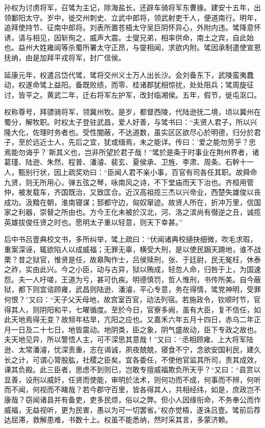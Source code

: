\documentclass[12pt,UTF8]{ctexbook}
\begin{document}
孙权为讨虏将军，召骘为主记，除海盐长，还辟车骑将军东曹掾。建安十五年，出领鄱阳太守。岁中，徙交州刺史、立武中郎将，领武射吏千人，便道南行。明年，追拜使持节、征南中郎将。刘表所置苍梧太守吴巨阴怀异心，外附内违。骘降意怀诱，请与相见，因斩徇之，威声大震。士燮兄弟，相率供命，南土之宾，自此始也。益州大姓雍闿等杀蜀所署太守正昂，与燮相闻，求欲内附。骘因承制遣使宣恩抚纳，由是加拜平戎将军，封广信侯。

延康元年，权遣吕岱代骘，骘将交州义士万人出长沙。会刘备东下，武陵蛮夷蠢动，权遂命骘上益阳。备既败绩，而零、桂诸郡犹相惊扰，处处阻兵；骘周旋征讨，皆平之。黄武二年，迁右将军左护军，改封临湘侯。五年，假节，徙屯沤口。

权称尊号，拜骠骑将军，领冀州牧。是岁，都督西陵，代陆逊抚二境，顷以冀州在蜀分，解牧职。时权太子登驻武昌，爱人好善，与骘书曰：“夫贤人君子，所以兴隆大化，佐理时务者也。受性闇蔽，不达道数，虽实区区欲尽心於明德，归分於君子，至於远近士人，先后之宜，犹或缅焉，未之能详。传曰：'爱之能勿劳乎？忠焉能勿诲乎？'斯其义也，岂非所望於君子哉！”骘於是条于时事业在荆州界者，诸葛瑾、陆逊、朱然、程普、潘濬、裴玄、夏侯承、卫旌、李肃、周条、石幹十一人，甄别行状，因上疏奖劝曰：“臣闻人君不亲小事，百官有司各任其职。故舜命九贤，则无所用心，弹五弦之琴，咏南风之诗，不下堂庙而天下治也。齐桓用管仲，被发载车，齐国既治，又致匡合。近汉高祖揽三杰以兴帝业，西楚失雄俊以丧成功。汲黯在朝，淮南寝谋；郅都守边，匈奴窜迹。故贤人所在，折冲万里，信国家之利器，崇替之所由也。方今王化未被於汉北，河、洛之滨尚有僣逆之丑，诚揽英雄拔俊任贤之时也。愿明太子重以轻意，则天下幸甚。”

后中书吕壹典校文书，多所纠举，骘上疏曰：“伏闻诸典校擿抉细微，吹毛求瑕，重案深诬，辄欲陷人以成威福；无罪无辜，横受大刑，是以使民跼天蹐地，谁不战栗？昔之狱官，惟贤是任，故皋陶作士，吕侯赎刑，张、于廷尉，民无冤枉，休泰之祚，实由此兴。今之小臣，动与古异，狱以贿成，轻忽人命，归咎于上，为国速怨。夫一人吁嗟，王道为亏，甚可仇疾。明德慎罚，哲人惟刑，书传所美。自今蔽狱，都下则宜谘顾雍，武昌则陆逊、潘濬，平心专意，务在得情，骘党神明，受罪何恨？”又曰：“天子父天母地，故宫室百官，动法列宿。若施政令，钦顺时节，官得其人，则阴阳和平，七曜循度。至於今日，官寮多阙，虽有大臣，复不信任，如此天地焉得无变？故频年枯旱，亢阳之应也。又嘉禾六年五月十四日，赤乌二年正月一日及二十七日，地皆震动。地阴类，臣之象，阴气盛故动，臣下专政之故也。夫天地见异，所以警悟人主，可不深思其意哉！”又曰：“丞相顾雍、上大将军陆逊、太常潘濬，忧深责重，志在谒诚，夙夜兢兢，寝食不宁，念欲安国利民，建久长之计，可谓心膂股肱，社稷之臣矣。宜各委任，不使他官监其所司，责其成效，课其负殿。此三臣者，思虑不到则已，岂敢专擅威福欺负所天乎？“又曰：“县赏以显善，设刑以威奸，任贤而使能，审明於法术，则何功而不成，何事而不辨，何听而不闻，何视而不睹哉？若今郡守百里，皆各得其人，共相经纬，如是，庶政岂不康哉？窃闻诸县并有备吏，吏多民烦，俗以之弊。但小人因缘衔命，不务奉公而作威福，无益视听，更为民害，愚以为可一切罢省。”权亦觉梧，遂诛吕壹。骘前后荐达屈滞，救解患难，书数十上。权虽不能悉纳，然时采其言，多蒙济赖。
\end{document}
